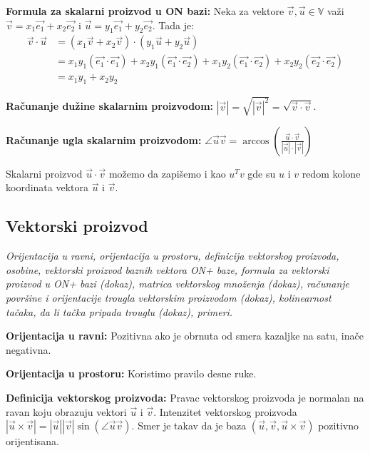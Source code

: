 \documentclass[12pt]{article}
\newcommand{\vek}[1]{\overrightarrow{#1}}
\begin{document}
\textbf{Formula za skalarni proizvod u ON bazi:} Neka za vektore $\vek{v},
    \vek{u}\in\mathbb{V}$ važi $\vek{v}=x_1\vek{e_1}+x_2\vek{e_2}$ i
$\vek{u}=y_1\vek{e_1}+y_2\vek{e_2}$. Tada je:
\begin{align*}
    \vek{v}\cdot\vek{u} & = (x_1\vek{v}+x_2\vek{v})\cdot(y_1\vek{u}+y_2\vek{u})                                                                             \\
                        & = x_1y_1(\vek{e_1}\cdot\vek{e_1})+x_2y_1(\vek{e_1}\cdot\vek{e_2})+x_1y_2(\vek{e_1}\cdot\vek{e_2})+x_2y_2(\vek{e_2}\cdot\vek{e_2}) \\
                        & = x_1y_1+x_2y_2
\end{align*}
\par

\textbf{Računanje dužine skalarnim proizvodom:} $|\vek{v}|=\sqrt{|\vek{v}|^2}=
    \sqrt{\vek{v}\cdot\vek{v}}$.
\par

\textbf{Računanje ugla skalarnim proizvodom:} $\angle{\vek{u}\vek{v}}=
    \arccos(\frac{\vek{u}\cdot\vek{v}}{|\vek{u}|\cdot|\vek{v}|})$
\par

Skalarni proizvod $\vek{u}\cdot\vek{v}$ možemo da zapišemo i kao $u^Tv$ gde su
$u$ i $v$ redom kolone koordinata vektora $\vek{u}$ i $\vek{v}$.
\par

\subsection{Vektorski proizvod}
\textit{Orijentacija u ravni, orijentacija u prostoru, definicija vektorskog
    proizvoda, osobine, vektorski proizvod baznih vektora ON+ baze, formula za
    vektorski proizvod u ON+ bazi (dokaz), matrica vektorskog množenja (dokaz),
    računanje površine i orijentacije trougla vektorskim proizvodom (dokaz),
    kolinearnost tačaka, da li tačka pripada trouglu (dokaz), primeri.}
\par
\vspace*{1cm}

\textbf{Orijentacija u ravni:} Pozitivna ako je obrnuta od smera kazaljke na
satu, inače negativna.
\par

\textbf{Orijentacija u prostoru:} Koristimo pravilo desne ruke.
\par

\textbf{Definicija vektorskog proizvoda:} Pravac vektorskog proizvoda je
normalan na ravan koju obrazuju vektori $\vek{u}$ i $\vek{v}$. Intenzitet
vektorskog proizvoda $|\vek{u}\times\vek{v}|=|\vek{u}||\vek{v}|
    \sin(\angle{\vek{u}\vek{v}})$. Smer je takav da je baza
$(\vek{u},\vek{v},\vek{u}\times\vek{v})$ pozitivno orijentisana.
\par
\end{document}
